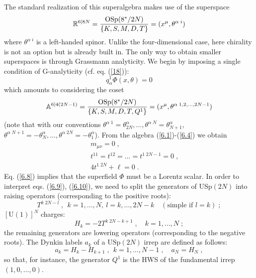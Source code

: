 \documentclass[a4paper,12pt]{article}
\begin{document}
The standard realization of this superalgebra makes use of the 
superspace 
\begin{equation}
{\mathbb R}^{6\vert 8N} = {\mbox{OSp}(8^*/2N)\over \{K,S,M,D,T\}} 
= (x^\mu,\theta^{\alpha\; i}) \label{6.5} 
\end{equation}
where $\theta^{\alpha\; i}$ is a left-handed spinor. Unlike the 
four-dimensional case,  here chirality is not an option but is 
already built in. The only way to obtain smaller superspaces is 
through Grassmann analyticity. We begin by imposing a single 
condition of G-analyticity (cf. eq. (\ref{18})): 
\begin{equation}\label{6.6}
  q^1_\alpha\Phi(x,\theta)=0
\end{equation}
which amounts to considering the coset
\begin{equation}
{\mathbb A}^{6\vert 4(2N-1)} = {\mbox{OSp}(8^*/2N)\over 
\{K,S,M,D,T,Q^1\}} = (x^\mu,\theta^{\alpha\; 1,2,\ldots,2N-1}) 
\label{6.7} 
\end{equation}
(note that with our conventions $\theta^{\alpha\; 
1}=\theta^\alpha_{2N}, \ldots, \theta^{\alpha\; 
N}=\theta^\alpha_{N+1}$, $\theta^{\alpha\; 
N+1}=-\theta^\alpha_N,\ldots,\theta^{\alpha\; 
2N}=-\theta^\alpha_1$). From the algebra (\ref{6.1})-(\ref{6.4}) 
we obtain 
\begin{eqnarray}
  &&m_{\mu\nu}=0\;, \label{6.8}\\
  &&t^{11}=t^{12}=\ldots=t^{1\; 2N-1}=0\;, \label{6.9}\\
  &&4t^{1\; 2N}+\ell=0\;.\label{6.10}
\end{eqnarray}
Eq. (\ref{6.8}) implies that the superfield $\Phi$ must be a 
Lorentz scalar. In order to interpret eqs. (\ref{6.9}), 
(\ref{6.10}), we need to split the generators of $\mbox{USp}(2N)$ 
into raising operators (corresponding to the positive roots):
\begin{equation}\label{6.111}
  T^{k\; 2N-l}\;, \ \ k=1,\ldots, N,\ l=k,\ldots,2N-k\quad (\mbox{simple if 
$l=k$})\;;
\end{equation}
$[\mbox{U}(1)]^N$ charges: 
\begin{equation}\label{6.112}
  H_k = -2 T^{k\; 2N-k+1}\;, \quad k=1,\ldots, N\;; 
\end{equation}
the remaining generators are lowering operators (corresponding to 
the negative roots). The  Dynkin labels $a_k$ of a  
$\mbox{USp}(2N)$ irrep are defined as follows:
\begin{equation}\label{6.113}
  a_k=H_k-H_{k+1}\;, \ \ k=1,\ldots,N-1\;, \quad a_N=H_N\;,
\end{equation}
so that, for instance, the generator $Q^1$ is the HWS of the 
fundamental irrep $(1,0,\ldots,0)$. 
\end{document}
